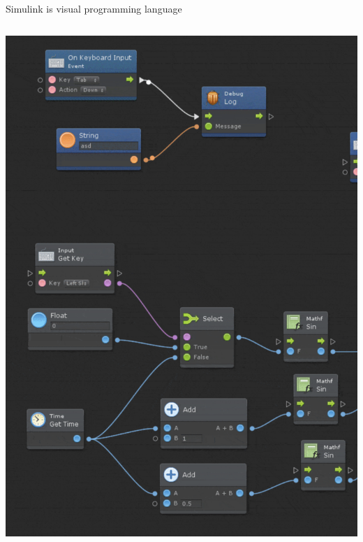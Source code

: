 \begin{frame}{Simulink is visual programming language}
\begin{columns}
\begin{column}{0.5\textwidth}
  \includegraphics[scale = 0.2]{lesson_2/images/simulink_visual_programming.png}
  \end{column}
  \end{columns}
\end{frame}

